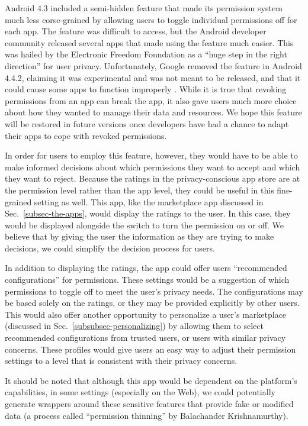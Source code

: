 \documentclass[11pt]{article}
\begin{document}
Android 4.3 included a semi-hidden feature that made its permission
system much less corse-grained by allowing users to toggle individual
permissions off for each app. The feature was difficult to
access, but the Android developer community released several apps that
made using the feature much easier.  This was hailed by the Electronic
Freedom Foundation as a ``huge step in the right direction'' 
\cite{eff-applaud-android}
for user privacy. Unfortunately, Google removed the feature in Android 4.4.2,
claiming it was experimental and was not meant to be released, and that it could
cause some apps to function improperly \cite{eff-denounce-android}.
While it is true that revoking permissions from an app can break the
app, it also gave users much more choice about how they wanted to
manage their data and resources. We hope this feature will be
restored in future versions once developers have had a chance to adapt
their apps to cope with revoked permissions.

In order for users to employ this feature, however, they would have to be
able to make informed decisions about which permissions they want to
accept and which they want to reject. Because the ratings in the
privacy-conscious app store are at the permission level rather than
the app level, they could be useful in this fine-grained setting as
well. This app, like the marketplace app discussed in Sec.~\ref{subsec-the-apps}, 
would display the ratings to the
user. In this case, they would be displayed alongside the switch to
turn the permission on or off. We believe that by giving the user the
information as they are trying to make decisions, we could simplify the
decision process for users.

In addition to displaying the ratings, the app could offer users
``recommended configurations'' for permissions. These settings would be a 
suggestion of which permissions to toggle off to meet the user's privacy needs. 
The configurations may be based solely on the ratings, or they may be provided 
explicitly by other users. This would also offer another opportunity to personalize a
user's marketplace (discussed in Sec.~\ref{subsubsec-personalizing}) by allowing 
them to select recommended configurations from trusted users, or users with similar
privacy concerns. These profiles would give users an
easy way to adjust their permission settings to a level that is
consistent with their privacy concerns.

It should be noted that although this app would be dependent on the 
platform's capabilities, in some settings (especially on the
Web), we could potentially generate wrappers around these sensitive
features that provide fake or modified data (a process called
``permission thinning'' by Balachander Krishnamurthy).
\end{document}
